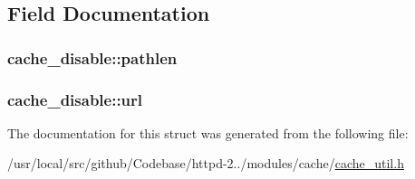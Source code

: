 \subsection{Field Documentation}
\subsubsection[{\texorpdfstring{pathlen}{pathlen}}]{ cache\+\_\+disable\+::pathlen}\hypertarget{structcache__disable_ad7ba683fd82f0243459781622258323c}{}\label{structcache__disable_ad7ba683fd82f0243459781622258323c}
\subsubsection[{\texorpdfstring{url}{url}}]{ cache\+\_\+disable\+::url}\hypertarget{structcache__disable_abef87ff9b23f7bd1d58d0f95a37a26b2}{}\label{structcache__disable_abef87ff9b23f7bd1d58d0f95a37a26b2}


The documentation for this struct was generated from the following file\+:\begin{DoxyCompactItemize}
\item 
/usr/local/src/github/\+Codebase/httpd-\/2../modules/cache/\hyperlink{cache__util_8h}{cache\+\_\+util.\+h}\end{DoxyCompactItemize}
